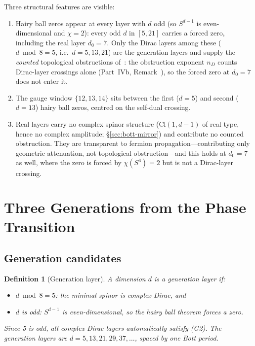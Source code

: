 \documentclass[12pt,a4paper]{article}
\newtheorem{definition}[theorem]{Definition}
\begin{document}
Three structural features are visible:
\begin{enumerate}
\item Hairy ball zeros appear at every layer with $d$ odd (so $S^{d-1}$ is even-dimensional
and $\chi=2$): every odd $d$ in $[5,21]$ carries a forced zero, including the real layer
$d_0=7$. Only the Dirac layers among these ($d\bmod 8=5$, i.e.\ $d=5,13,21$) are the
generation layers and supply the \emph{counted} topological obstructions
of~\cite{part4b}: the obstruction exponent $n_D$ counts Dirac-layer crossings alone
(Part~IVb, Remark~), so the forced zero at $d_0=7$ does not
enter it.
\item The gauge window $\{12,13,14\}$ sits between the first ($d=5$) and second ($d=13$)
hairy ball zeros, centred on the self-dual crossing.
\item Real layers carry no complex spinor structure ($\mathrm{Cl}(1,d-1)$ of real type,
hence no complex amplitude; \S\ref{sec:bott-mirror}) and contribute no counted obstruction.
They are transparent to fermion propagation---contributing only geometric attenuation, not
topological obstruction---and this holds at $d_0=7$ as well, where the zero is forced by
$\chi(S^6)=2$ but is not a Dirac-layer crossing.
\end{enumerate}

\section{Three Generations from the Phase Transition}\label{sec:three-generations}

\subsection{Generation candidates}

\begin{definition}[Generation layer]
A dimension $d$ is a generation layer if:
\begin{itemize}
\item[(G1)] $d\bmod 8=5$: the minimal spinor is complex Dirac, and
\item[(G2)] $d$ is odd: $S^{d-1}$ is even-dimensional, so the hairy ball theorem forces
a zero.
\end{itemize}
Since 5 is odd, all complex Dirac layers automatically satisfy (G2). The generation layers
are $d=5,13,21,29,37,\ldots$, spaced by one Bott period.
\end{definition}
\end{document}

